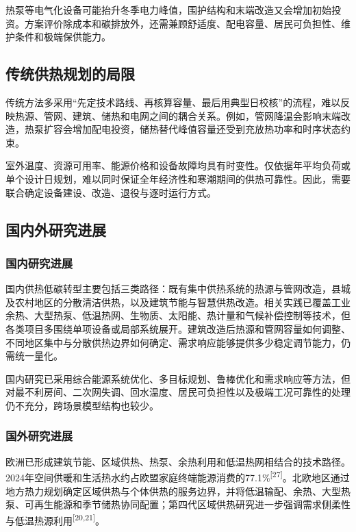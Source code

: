 \documentclass[12pt,a4paper]{article}
\newcommand{\supcite}[1]{\textsuperscript{[#1]}}
\begin{document}
热泵等电气化设备可能抬升冬季电力峰值，围护结构和末端改造又会增加初始投资。方案评价除成本和碳排放外，还需兼顾舒适度、配电容量、居民可负担性、维护条件和极端保供能力。

\subsection{传统供热规划的局限}

传统方法多采用“先定技术路线、再核算容量、最后用典型日校核”的流程，难以反映热源、管网、建筑、储热和电网之间的耦合关系。例如，管网降温会影响末端改造，热泵扩容会增加配电投资，储热替代峰值容量还受到充放热功率和时序状态约束。

室外温度、资源可用率、能源价格和设备故障均具有时变性。仅依据年平均负荷或单个设计日规划，难以同时保证全年经济性和寒潮期间的供热可靠性。因此，需要联合确定设备建设、改造、退役与逐时运行方式。

\subsection{国内外研究进展}

\subsubsection{国内研究进展}

国内供热低碳转型主要包括三类路径：既有集中供热系统的热源与管网改造，县城及农村地区的分散清洁供热，以及建筑节能与智慧供热改造。相关实践已覆盖工业余热、大型热泵、低温热网、生物质、太阳能、热计量和气候补偿控制等技术，但各类项目多围绕单项设备或局部系统展开。建筑改造后热源和管网容量如何调整、不同地区集中与分散供热边界如何确定、需求响应能够提供多少稳定调节能力，仍需统一量化。

国内研究已采用综合能源系统优化、多目标规划、鲁棒优化和需求响应等方法，但对最不利房间、二次网失调、回水温度、居民可负担性以及极端工况可靠性的处理仍不充分，跨场景模型结构也较少。

\subsubsection{国外研究进展}

欧洲已形成建筑节能、区域供热、热泵、余热利用和低温热网相结合的技术路径。2024年空间供暖和生活热水约占欧盟家庭终端能源消费的77.1\%\supcite{27}。北欧地区通过地方热力规划确定区域供热与个体供热的服务边界，并将低温输配、余热、大型热泵、可再生能源和季节储热协同配置；第四代区域供热研究进一步强调需求侧柔性与低温热源利用\supcite{20,21}。
\end{document}
